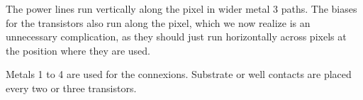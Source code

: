 
The power lines run vertically along the pixel in wider metal 3 paths. The biases for the transistors also run along the pixel, which we now realize is an unnecessary complication, as they should just run horizontally across pixels at the position where they are used. 

Metals 1 to 4 are used for the connexions. 
Substrate or well contacts are placed every two or three transistors. 

